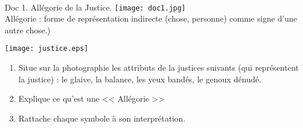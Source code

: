 \documentclass[12pt]{article}
\begin{document}
 \\

\begin{minipage}{8cm}{Doc 1. Allégorie de la Justice.}
 \texttt{[image: doc1.jpg]}\\
\tiny Allégorie : forme de représentation indirecte (chose, personne) comme signe d'une autre chose.)
\end{minipage}
\begin{minipage}{10cm}
\texttt{[image: justice.eps]}
\end{minipage}

\vspace{0.3cm}

\begin{minipage}{19cm}
\begin{enumerate}
\item  Situe sur la photographie les attributs de la justices suivants (qui représentent la justice) : le glaive, la balance, les yeux bandés, le genoux dénudé.
\item Explique ce qu'est une << Allégorie >> \\

\item Rattache chaque symbole à son interprétation. \\

\end{enumerate}
\end{minipage}

\vfill

\end{document}
